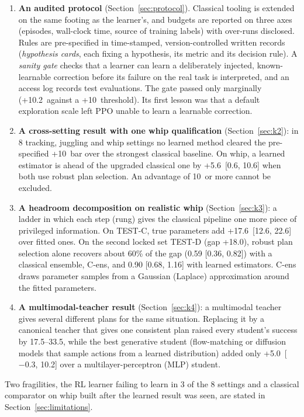 \begin{enumerate}
\item[\textbf{K1}] \textbf{An audited protocol} (Section~\ref{sec:protocol}). Classical tooling is extended on the same footing as the learner's, and budgets are reported on three axes (episodes, wall-clock time, source of training labels) with over-runs disclosed. Rules are pre-specified in time-stamped, version-controlled written records (\emph{hypothesis cards}, each fixing a hypothesis, its metric and its decision rule). A \emph{sanity gate} checks that a learner can learn a deliberately injected, known-learnable correction before its failure on the real task is interpreted, and an access log records test evaluations. The gate passed only marginally (+10.2\pp\ against a +10\pp\ threshold). Its first lesson was that a default exploration scale left PPO unable to learn a learnable correction.
\item[\textbf{K2}] \textbf{A cross-setting result with one whip qualification} (Section~\ref{sec:k2}): in 8 tracking, juggling and whip settings no learned method cleared the pre-specified +10\pp\ bar over the strongest classical baseline. On whip, a learned estimator is ahead of the upgraded classical one by +5.6\pp\ [0.6, 10.6] when both use robust plan selection. An advantage of 10\pp\ or more cannot be excluded.
\item[\textbf{K3}] \textbf{A headroom decomposition on realistic whip} (Section~\ref{sec:k3}): a ladder in which each step (rung) gives the classical pipeline one more piece of privileged information. On TEST-C, true parameters add +17.6\pp\ [12.6, 22.6] over fitted ones. On the second locked set TEST-D (gap +18.0\pp), robust plan selection alone recovers about 60\% of the gap (0.59 [0.36, 0.82]) with a classical ensemble, C-ens, and 0.90 [0.68, 1.16] with learned estimators. C-ens draws parameter samples from a Gaussian (Laplace) approximation around the fitted parameters.
\item[\textbf{K4}] \textbf{A multimodal-teacher result} (Section~\ref{sec:k4}): a multimodal teacher gives several different plans for the same situation. Replacing it by a canonical teacher that gives one consistent plan raised every student's success by 17.5--33.5\pp, while the best generative student (flow-matching or diffusion models that sample actions from a learned distribution) added only +5.0\pp\ [$-0.3$, 10.2] over a multilayer-perceptron (MLP) student.
\end{enumerate}

Two fragilities, the RL learner failing to learn in 3 of the 8 settings and a classical comparator on whip built after the learned result was seen, are stated in Section~\ref{sec:limitations}.


